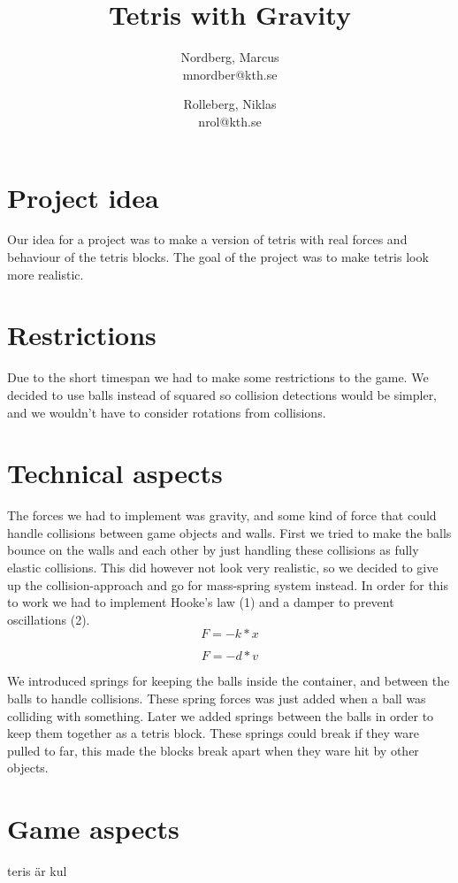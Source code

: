 \documentclass[11pt]{article} %
\title{Tetris with Gravity}
\author{Nordberg, Marcus \\ mnordber@kth.se
		\and
	Rolleberg, Niklas \\ nrol@kth.se}
\begin{document}
\maketitle

\section{Project idea}
Our idea for a project was to make a version of tetris with real forces and behaviour of the tetris blocks. The goal of the project was to make tetris look more realistic. 

\section{Restrictions}
Due to the short timespan we had to make some restrictions to the game. We decided to use balls instead of squared so collision detections would be simpler, and we wouldn't have to consider rotations from collisions.

\section{Technical aspects}
The forces we had to implement was gravity, and some kind of force that could handle collisions between game objects and walls. First we tried to make the balls bounce on the walls and each other by just handling these collisions as fully elastic collisions. This did however not look very realistic, so we decided to give up the collision-approach and go for mass-spring system instead. In order for this to work we had to implement Hooke's law (1) and a damper to prevent oscillations (2).
\begin{equation}
       F = -k*x
\end{equation}

\begin{equation}
       F = -d*v
\end{equation}

We introduced springs for keeping the balls inside the container, and between the balls to handle collisions. These spring forces was just added when a ball was colliding with something. Later we added springs between the balls in order to keep them together as a tetris block. These springs could break if they ware pulled to far, this made the blocks break apart when they ware hit by other objects.   

 

\section{Game aspects}
teris är kul
\end{document}
